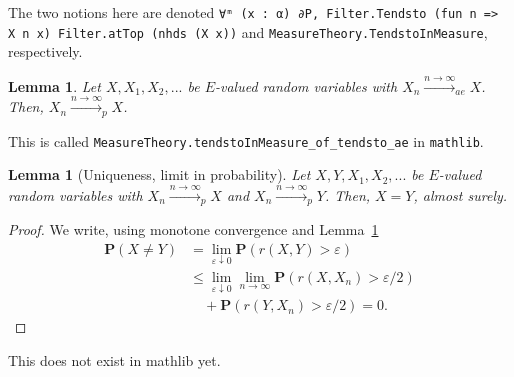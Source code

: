 \documentclass{article}
\newtheorem{lemma}[proposition]{Lemma}
\theoremstyle{definition}
\theoremstyle{step} \newtheorem{step}{Step}
\newcommand{\leanline}[1]{\texttt{#1}}%
\begin{document}
\begin{paracol}{2}
  \switchcolumn
  The two notions here are denoted \leanline{∀ᵐ (x : α) ∂P,
    Filter.Tendsto (fun n => X n x) Filter.atTop (nhds (X x))} and
  \leanline{MeasureTheory.TendstoInMeasure}, respectively.

  \switchcolumn*
  \begin{lemma}\label{l:aep}
    \sloppy Let $X,X_1,X_2,...$ be $E$-valued random variables with $X_n
      \xrightarrow{n\to\infty}_{ae} X$. Then, $X_n
      \xrightarrow{n\to\infty}_{p} X$.
  \end{lemma}

  \switchcolumn \sloppy This is called
  \leanline{MeasureTheory.tendstoInMeasure_of_tendsto_ae} in
  \leanline{mathlib}.

  \switchcolumn*
  \sloppy
  \begin{lemma}[\sloppy Uniqueness, limit in probability]\label{l:puni}
    \mbox{} Let $X,Y,X_1,X_2,...$ be $E$-valued random variables with
    $X_n \xrightarrow{n\to\infty}_{p} X$ and $X_n
      \xrightarrow{n\to\infty}_{p} Y$. Then, $X=Y$, almost surely.
  \end{lemma}

  \begin{proof}
    We write, using monotone convergence and Lemma~\ref{l:aep}
    \begin{align*}
      \mathbf P(X\neq Y) & = \lim_{\varepsilon \downarrow 0} \mathbf
      P(r(X,Y)>\varepsilon)                                          \\ & \leq \lim_{\varepsilon \downarrow 0}
      \lim_{n\to\infty}\mathbf P(r(X,X_n)>\varepsilon/2)             \\ & \quad +
      \mathbf P(r(Y,X_n)>\varepsilon/2) = 0.
    \end{align*}
  \end{proof}

  \switchcolumn

  This does not exist in mathlib yet.



\end{paracol}
\end{document}
